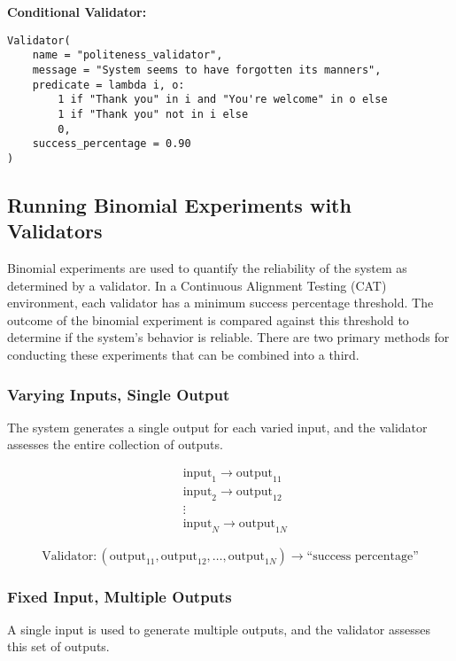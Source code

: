 \documentclass{article}
\begin{document}
\vspace{1em}
\textbf{Conditional Validator:}
\begin{lstlisting}
Validator(
    name = "politeness_validator",
    message = "System seems to have forgotten its manners",
    predicate = lambda i, o: 
        1 if "Thank you" in i and "You're welcome" in o else
        1 if "Thank you" not in i else
        0,
    success_percentage = 0.90
)
\end{lstlisting}


\subsection{Running Binomial Experiments with Validators}

Binomial experiments are used to quantify the reliability of the system as determined by a validator. In a Continuous Alignment Testing (CAT) environment, each validator has a minimum success percentage threshold. The outcome of the binomial experiment is compared against this threshold to determine if the system's behavior is reliable. There are two primary methods for conducting these experiments that can be combined into a third.

\subsubsection{Varying Inputs, Single Output}
The system generates a single output for each varied input, and the validator assesses the entire collection of outputs.

\begin{equation*}
\begin{aligned}
&\text{input}_1 \rightarrow \text{output}_{11} \\
&\text{input}_2 \rightarrow \text{output}_{12} \\
&\vdots \\
&\text{input}_N \rightarrow \text{output}_{1N} 
\end{aligned}
\end{equation*}

\begin{equation*}
\text{Validator}: (\text{output}_{11}, \text{output}_{12}, \ldots, \text{output}_{1N}) \rightarrow \text{``success percentage''}
\end{equation*}

\subsubsection{Fixed Input, Multiple Outputs}
A single input is used to generate multiple outputs, and the validator assesses this set of outputs.
\end{document}
